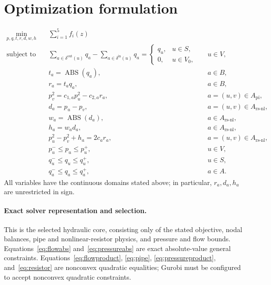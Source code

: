 \documentclass[11pt]{article}
\begin{document}
\section{Optimization formulation}
\begin{align}
\min_{p,q,t,r,d,w,h}\quad
&\sum_{i=1}^{5} f_i(z)
\label{eq:objective}\\
\text{subject to}\quad
&\sum_{a\in\delta^{\mathrm{out}}(u)}q_a
-\sum_{a\in\delta^{\mathrm{in}}(u)}q_a
=\begin{cases}
q_u,&u\in S,\\
0,&u\in V_0,
\end{cases}
&&u\in V,
\label{eq:balance}\\
&t_a=\operatorname{ABS}(q_a),
&&a\in B,
\label{eq:flowabs}\\
&r_a=t_aq_a,
&&a\in B,
\label{eq:flowproduct}\\
&p_v^2=c_{1,a}p_u^2-c_{2,a}r_a,
&&a=(u,v)\in A_{\mathrm{pi}},
\label{eq:pipe}\\
&d_a=p_u-p_v,
&&a=(u,v)\in A_{\mathrm{rs\text{-}nl}},
\label{eq:difference}\\
&w_a=\operatorname{ABS}(d_a),
&&a\in A_{\mathrm{rs\text{-}nl}},
\label{eq:pressureabs}\\
&h_a=w_ad_a,
&&a\in A_{\mathrm{rs\text{-}nl}},
\label{eq:pressureproduct}\\
&p_u^2-p_v^2+h_a=2c_ar_a,
&&a=(u,v)\in A_{\mathrm{rs\text{-}nl}},
\label{eq:resistor}\\
&p_u^-\leq p_u\leq p_u^+,
&&u\in V,
\label{eq:pressurebounds}\\
&q_u^-\leq q_u\leq q_u^+,
&&u\in S,
\label{eq:nodalbounds}\\
&q_a^-\leq q_a\leq q_a^+,
&&a\in A.
\label{eq:arcbounds}
\end{align}
All variables have the continuous domains stated above; in particular, $r_a,d_a,h_a$ are unrestricted in sign.

\paragraph{Exact solver representation and selection.}
This is the selected hydraulic core, consisting only of the stated objective, nodal balances, pipe and nonlinear-resistor physics, and pressure and flow bounds.  Equations~\eqref{eq:flowabs} and~\eqref{eq:pressureabs} are exact absolute-value general constraints. Equations~\eqref{eq:flowproduct}, \eqref{eq:pipe}, \eqref{eq:pressureproduct}, and~\eqref{eq:resistor} are nonconvex quadratic equalities; Gurobi must be configured to accept nonconvex quadratic constraints.
\end{document}
